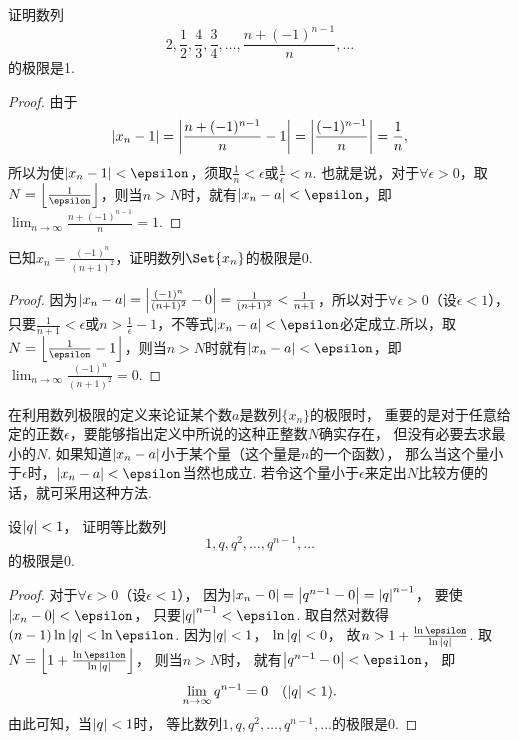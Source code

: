 \begin{example}
证明数列\[
2,\frac{1}{2},\frac{4}{3},\frac{3}{4},\dotsc,\frac{n+(-1)^{n-1}}{n},\dotsc
\]的极限是1.
\begin{proof}
由于\[
\abs{x_n - 1}
= \abs{\frac{n+(-1)^{n-1}}{n}-1}
= \abs{\frac{(-1)^{n-1}}{n}}
= \frac{1}{n},
\]所以为使\(\abs{x_n - 1} < \epsilon\)，须取\(\frac{1}{n} < \epsilon\)或\(\frac{1}{\epsilon} < n\).
也就是说，对于\(\forall \epsilon > 0\)，取\(N = \floor*{\frac{1}{\epsilon}}\)，则当\(n > N\)时，就有\(\abs{x_n - a} < \epsilon\)，即\(\lim_{n\to\infty}\frac{n+(-1)^{n-1}}{n}=1\).
\end{proof}
\end{example}

\begin{example}
已知\(x_n = \frac{(-1)^n}{(n+1)^2}\)，证明数列\(\Set{x_n}\)的极限是\(0\).
\begin{proof}
因为\(\abs{x_n - a} = \abs{\frac{(-1)^n}{(n+1)^2}-0} = \frac{1}{(n+1)^2} < \frac{1}{n+1}\)，所以对于\(\forall\epsilon>0\)（设\(\epsilon<1\)），只要\(\frac{1}{n+1}<\epsilon\)或\(n>\frac{1}{\epsilon}-1\)，不等式\(\abs{x_n-a}<\epsilon\)必定成立.所以，取\(N=\floor*{\frac{1}{\epsilon}-1}\)，则当\(n>N\)时就有\(\abs{x_n - a}<\epsilon\)，即\(\lim_{n\to\infty}\frac{(-1)^n}{(n+1)^2}=0\).
\end{proof}
\end{example}

在利用数列极限的定义来论证某个数\(a\)是数列\(\{x_n\}\)的极限时，
重要的是对于任意给定的正数\(\epsilon\)，要能够指出定义中所说的这种正整数\(N\)确实存在，
但没有必要去求最小的\(N\).
如果知道\(\abs{x_n-a}\)小于某个量（这个量是\(n\)的一个函数），
那么当这个量小于\(\epsilon\)时，\(\abs{x_n-a}<\epsilon\)当然也成立.
若令这个量小于\(\epsilon\)来定出\(N\)比较方便的话，就可采用这种方法.

\begin{example}
设\(\abs{q}<1\)，
证明等比数列\[
	1,q,q^2,\dotsc,q^{n-1},\dotsc
\]的极限是\(0\).
\begin{proof}
对于\(\forall\epsilon>0\)（设\(\epsilon<1\)），
因为\(\abs{x_n-0}=\abs{q^{n-1}-0}=\abs{q}^{n-1}\)，
要使\(\abs{x_n-0}<\epsilon\)，
只要\(\abs{q}^{n-1}<\epsilon\).
取自然对数得\((n-1)\ln\abs{q}<\ln\epsilon\).
因为\(\abs{q}<1\)，
\(\ln\abs{q}<0\)，
故\(n>1+\frac{\ln\epsilon}{\ln\abs{q}}\).
取\(N=\floor*{1+\frac{\ln\epsilon}{\ln\abs{q}}}\)，
则当\(n>N\)时，
就有\(\abs{q^{n-1}-0}<\epsilon\)，
即
\begin{equation}
	\lim_{n\to\infty}q^{n-1}=0
	\quad(\abs{q}<1).
\end{equation}
由此可知，当\(\abs{q}<1\)时，
等比数列\(1,q,q^2,\dotsc,q^{n-1},\dotsc\)的极限是\(0\).
\end{proof}
\end{example}

